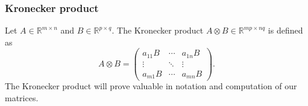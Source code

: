 \documentclass{article}
\begin{document}
\subsubsection{Kronecker product}
Let $A \in \mathbb{R}^{m\times n}$ and $B \in \mathbb{R}^{p \times q}$. The Kronecker product $A\otimes B\in \mathbb{R}^{mp \times nq}$ is defined as
\begin{equation*}
	A\otimes B = \begin{pmatrix}
		a_{11}B &\cdots & a_{1n}B\\
		\vdots & \ddots & \vdots\\
		a_{m1}B & \cdots & a_{mn}B
	\end{pmatrix}.
\end{equation*}
The Kronecker product will prove valuable in notation and computation of our matrices.
\end{document}
